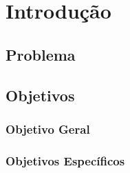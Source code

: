 \chapter[Introdução]{Introdução}

\section{Problema}


\section{Objetivos}

\subsection{Objetivo Geral}

\subsection{Objetivos Específicos}

